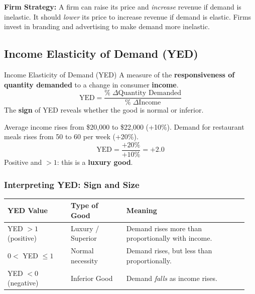 \documentclass[11pt, a4paper, twoside]{book}
\begin{document}
\begin{tcolorbox}[enhanced,colback=LightGold,colframe=GoldAccent,arc=0pt,boxrule=0.9pt,
  left=8pt,right=8pt,top=6pt,bottom=6pt]
\textbf{\color{NavyPrimary}Firm Strategy:} A firm can raise its price and \emph{increase} revenue if demand is inelastic. It should \emph{lower} its price to increase revenue if demand is elastic. Firms invest in branding and advertising to make demand more inelastic.
\end{tcolorbox}

\subsection{Income Elasticity of Demand (YED)}

\begin{keyterm}{Income Elasticity of Demand (YED)}
A measure of the \textbf{responsiveness of quantity demanded} to a change in consumer \textbf{income}.
\[
\text{YED} = \frac{\%\;\Delta\text{Quantity Demanded}}{\%\;\Delta\text{Income}}
\]
The \textbf{sign} of YED reveals whether the good is normal or inferior.
\end{keyterm}

\begin{example}
Average income rises from \$20{,}000 to \$22{,}000 (+10\%). Demand for restaurant meals rises from 50 to 60 per week (+20\%).
\[
\text{YED} = \frac{+20\%}{+10\%} = +2.0
\]
Positive and $> 1$: this is a \textbf{luxury good}.
\end{example}

\subsubsection{Interpreting YED: Sign and Size}

\begin{tcolorbox}[enhanced,colback=LightBlue,colframe=MidBlue!70,arc=0pt,boxrule=0.8pt]
\begin{tabular}{@{}>{\RaggedRight\arraybackslash}p{0.25\linewidth}>{\RaggedRight\arraybackslash}p{0.22\linewidth}>{\RaggedRight\arraybackslash}p{0.48\linewidth}@{}}
\textbf{\color{NavyPrimary}YED Value} & \textbf{\color{NavyPrimary}Type of Good} & \textbf{\color{NavyPrimary}Meaning} \\
\midrule
YED $> 1$ (positive) & Luxury / Superior & Demand rises more than proportionally with income. \\
$0 <$ YED $\leq 1$ & Normal necessity & Demand rises, but less than proportionally. \\
YED $< 0$ (negative) & Inferior Good & Demand \emph{falls} as income rises. \\
\end{tabular}
\end{tcolorbox}
\end{document}
